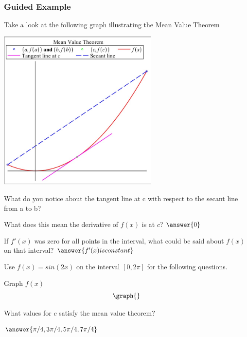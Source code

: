 \documentclass{ximera}
\begin{document}
\subsubsection{Guided Example}
Take a look at the following graph illustrating the Mean Value Theorem
\begin{image}
    \includegraphics[width=80mm]{meanvalue.jpg}
\end{image}
\begin{question}
What do you notice about the tangent line at c with respect to the secant line from a to b?
\begin{freeResponse}
\end{freeResponse}
What does this mean the derivative of $f(x)$ is at $c$?
$\answer{0}$
\end{question}
\begin{question}
If $f'(x)$ was zero for all points in the interval, what could be said about $f(x)$ on that interval?
$\answer{f'(x) is constant}$
\end{question}
\begin{question}
Use $f(x)=sin(2x)$ on the interval $[0,2\pi]$ for the following questions.

Graph $f(x)$
\[
\graph{}
\]

What values for $c$ satisfy the mean value theorem?

$\answer{\pi/4,3\pi/4,5\pi/4, 7\pi/4}$
\end{question}
\end{document}
